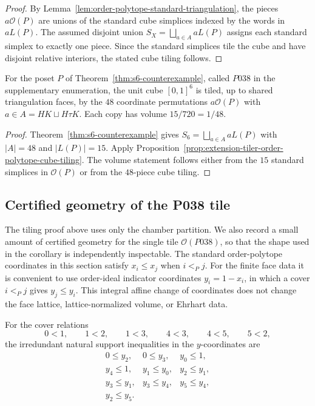 \begin{proof}
By Lemma~\ref{lem:order-polytope-standard-triangulation}, the pieces
$a\mathcal O(P)$ are unions of the standard cube simplices indexed by
the words in $aL(P)$.  The assumed disjoint union
$S_X=\bigsqcup_{a\in A}aL(P)$ assigns each standard simplex to exactly
one piece.  Since the standard simplices tile the cube and have disjoint
relative interiors, the stated cube tiling follows.
\end{proof}

\begin{corollary}
\label{cor:p038-order-polytope-cube-tiling}
For the poset $P$ of Theorem~\ref{thm:s6-counterexample}, called $P038$ in
the supplementary enumeration, the unit cube $[0,1]^6$ is tiled, up to
shared triangulation faces, by the $48$ coordinate permutations
$a\mathcal O(P)$ with $a\in A=HK\sqcup H\tau K$.  Each copy has volume
$15/720=1/48$.
\end{corollary}

\begin{proof}
Theorem~\ref{thm:s6-counterexample} gives
$S_6=\bigsqcup_{a\in A}aL(P)$ with $|A|=48$ and $|L(P)|=15$.
Apply Proposition~\ref{prop:extension-tiler-order-polytope-cube-tiling}.
The volume statement follows either from the $15$ standard simplices in
$\mathcal O(P)$ or from the $48$-piece cube tiling.
\end{proof}

\subsection{Certified geometry of the P038 tile}

The tiling proof above uses only the chamber partition.  We also record a
small amount of certified geometry for the single tile \(\mathcal O(P038)\),
so that the shape used in the corollary is independently inspectable.
The standard order-polytope coordinates in this section satisfy
\(x_i\le x_j\) when \(i<_P j\).  For the finite face data it is convenient to
use order-ideal indicator coordinates \(y_i=1-x_i\), in which a cover
\(i<_P j\) gives \(y_j\le y_i\).  This integral affine change of coordinates
does not change the face lattice, lattice-normalized volume, or Ehrhart data.

For the cover relations
\[
        0<1,\qquad 1<2,\qquad 1<3,\qquad
        4<3,\qquad 4<5,\qquad 5<2,
\]
the irredundant natural support inequalities in the \(y\)-coordinates are
\[
\begin{array}{lll}
  0\le y_2, & 0\le y_3, & y_0\le 1,\\
  y_4\le 1, & y_1\le y_0, & y_2\le y_1,\\
  y_3\le y_1, & y_3\le y_4, & y_5\le y_4,\\
  y_2\le y_5. &&
\end{array}
\]

